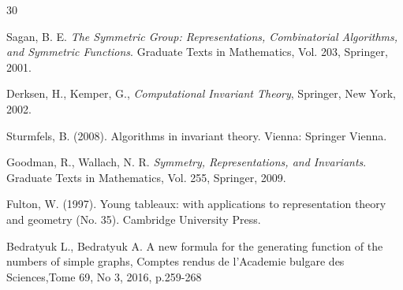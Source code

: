 \documentclass[12pt,reqno]{amsart}
\begin{document}
\begin{thebibliography}{30}


Sagan, B. E.
\emph{The Symmetric Group: Representations, Combinatorial Algorithms, and Symmetric Functions}.
Graduate Texts in Mathematics, Vol. 203, Springer, 2001.







Derksen, H., Kemper, G.,
\emph{Computational Invariant Theory},
Springer, New York, 2002.

Sturmfels, B. (2008). Algorithms in invariant theory. Vienna: Springer Vienna.




Goodman, R., Wallach, N. R.
\emph{Symmetry, Representations, and Invariants}.
Graduate Texts in Mathematics, Vol. 255, Springer, 2009.


Fulton, W. (1997). Young tableaux: with applications to representation theory and geometry (No. 35). Cambridge University Press.

Bedratyuk L., Bedratyuk A.
 A new formula for the generating function of the numbers of simple graphs,
Comptes rendus de l'Academie bulgare des Sciences,Tome 69, No 3, 2016, p.259-268


\end{thebibliography}
\end{document}

